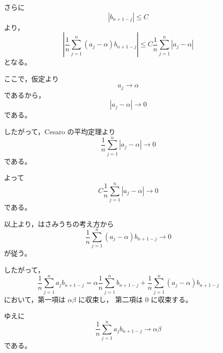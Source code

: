 \begin{strategy}
    さらに
    \[
        |b_{n+1-j}|\leq C
    \]
    より，
    \[
        \left|
            \frac{1}{n}\sum_{j=1}^{n}(a_j-\alpha)b_{n+1-j}
        \right|
        \leq
        C\frac{1}{n}\sum_{j=1}^{n}|a_j-\alpha|
    \]
    となる。

    ここで，仮定より
    \[
        a_j\to\alpha
    \]
    であるから，
    \[
        |a_j-\alpha|\to 0
    \]
    である。

    したがって，Cesaro の平均定理より
    \[
        \frac{1}{n}\sum_{j=1}^{n}|a_j-\alpha|
        \to
        0
    \]
    である。

    よって
    \[
        C\frac{1}{n}\sum_{j=1}^{n}|a_j-\alpha|
        \to
        0
    \]
    である。

    以上より，はさみうちの考え方から
    \[
        \frac{1}{n}\sum_{j=1}^{n}(a_j-\alpha)b_{n+1-j}
        \to
        0
    \]
    が従う。

    したがって，
    \[
        \frac{1}{n}\sum_{j=1}^{n}a_jb_{n+1-j}
        =
        \alpha
        \frac{1}{n}\sum_{j=1}^{n}b_{n+1-j}
        +
        \frac{1}{n}\sum_{j=1}^{n}(a_j-\alpha)b_{n+1-j}
    \]
    において，第一項は $\alpha\beta$ に収束し，
    第二項は $0$ に収束する。

    ゆえに
    \[
        \frac{1}{n}\sum_{j=1}^{n}a_jb_{n+1-j}
        \to
        \alpha\beta
    \]
    である。
\end{strategy}